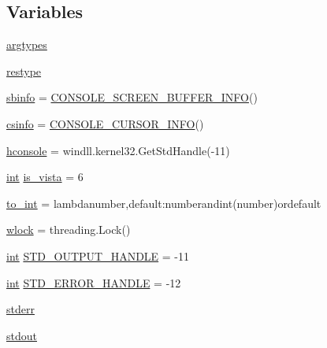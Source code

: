 \subsection*{Variables}
\begin{DoxyCompactItemize}
\item 
\hyperlink{namespacewaflib_1_1ansiterm_a9aff23048a11d61e457650af047db8aa}{argtypes}
\item 
\hyperlink{namespacewaflib_1_1ansiterm_a05fad996d2ba1e2a96d57bd1c7c9e68a}{restype}
\item 
\hyperlink{namespacewaflib_1_1ansiterm_ad610af241e734e13a1e32457721b778b}{sbinfo} = \hyperlink{classwaflib_1_1ansiterm_1_1_c_o_n_s_o_l_e___s_c_r_e_e_n___b_u_f_f_e_r___i_n_f_o}{C\+O\+N\+S\+O\+L\+E\+\_\+\+S\+C\+R\+E\+E\+N\+\_\+\+B\+U\+F\+F\+E\+R\+\_\+\+I\+N\+FO}()
\item 
\hyperlink{namespacewaflib_1_1ansiterm_a009aef0fcd8f29f1fabc093da0d94129}{csinfo} = \hyperlink{classwaflib_1_1ansiterm_1_1_c_o_n_s_o_l_e___c_u_r_s_o_r___i_n_f_o}{C\+O\+N\+S\+O\+L\+E\+\_\+\+C\+U\+R\+S\+O\+R\+\_\+\+I\+N\+FO}()
\item 
\hyperlink{namespacewaflib_1_1ansiterm_a2bcb8c0ee13517e8077870c44f8aad61}{hconsole} = windll.\+kernel32.\+Get\+Std\+Handle(-\/11)
\item 
\hyperlink{xmltok_8h_a5a0d4a5641ce434f1d23533f2b2e6653}{int} \hyperlink{namespacewaflib_1_1ansiterm_a9eae986391aa97704f9e307a40a3a7b6}{is\+\_\+vista} = 6
\item 
\hyperlink{namespacewaflib_1_1ansiterm_a2656c7dab888e042181e8dfbfb2ed8bb}{to\+\_\+int} = lambdanumber,default\+:numberandint(number)ordefault
\item 
\hyperlink{namespacewaflib_1_1ansiterm_a36db5a59deafb158699cfb5adaba0fa9}{wlock} = threading.\+Lock()
\item 
\hyperlink{xmltok_8h_a5a0d4a5641ce434f1d23533f2b2e6653}{int} \hyperlink{namespacewaflib_1_1ansiterm_a3eaf6a851a6729c250d7a9280efb4821}{S\+T\+D\+\_\+\+O\+U\+T\+P\+U\+T\+\_\+\+H\+A\+N\+D\+LE} = -\/11
\item 
\hyperlink{xmltok_8h_a5a0d4a5641ce434f1d23533f2b2e6653}{int} \hyperlink{namespacewaflib_1_1ansiterm_a8e9bd079147f6c23617a79cb6313e555}{S\+T\+D\+\_\+\+E\+R\+R\+O\+R\+\_\+\+H\+A\+N\+D\+LE} = -\/12
\item 
\hyperlink{namespacewaflib_1_1ansiterm_a44bedfddf1392d636441272f5f3c95d4}{stderr}
\item 
\hyperlink{namespacewaflib_1_1ansiterm_acf95a6e21629de2ca2b5716f5089f3f0}{stdout}
\end{DoxyCompactItemize}


